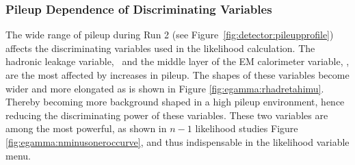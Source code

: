 \subsubsection{Pileup Dependence of Discriminating Variables}
\label{sec:egamma:pileup}
The wide range of pileup during Run 2 (see Figure~\ref{fig:detector:pileupprofile}) affects the discriminating variables used in the likelihood calculation.
The hadronic leakage variable, \rhad\ and the middle layer of the EM calorimeter variable, \reta, are the most affected by increases in pileup.
The shapes of these variables become wider and more elongated as is shown in Figure \ref{fig:egamma:rhadretahimu}.
Thereby becoming more background shaped in a high pileup environment, hence reducing the discriminating power of these variables.
These two variables are among the most powerful, as shown in $n-1$ likelihood studies Figure \ref{fig:egamma:nminusoneroccurve}, and thus indispensable in the likelihood variable menu.
